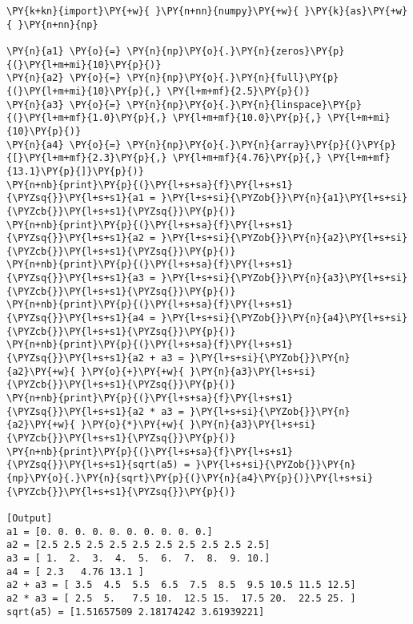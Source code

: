 \begin{Verbatim}[label=\makebox{\href{https://github.com/unipi-physics-labs/lab1-notes/tree/main/snippy/numpy_arrays.py}{https://github.com/.../numpy\_arrays.py}},commandchars=\\\{\}]
\PY{k+kn}{import}\PY{+w}{ }\PY{n+nn}{numpy}\PY{+w}{ }\PY{k}{as}\PY{+w}{ }\PY{n+nn}{np}

\PY{n}{a1} \PY{o}{=} \PY{n}{np}\PY{o}{.}\PY{n}{zeros}\PY{p}{(}\PY{l+m+mi}{10}\PY{p}{)}
\PY{n}{a2} \PY{o}{=} \PY{n}{np}\PY{o}{.}\PY{n}{full}\PY{p}{(}\PY{l+m+mi}{10}\PY{p}{,} \PY{l+m+mf}{2.5}\PY{p}{)}
\PY{n}{a3} \PY{o}{=} \PY{n}{np}\PY{o}{.}\PY{n}{linspace}\PY{p}{(}\PY{l+m+mf}{1.0}\PY{p}{,} \PY{l+m+mf}{10.0}\PY{p}{,} \PY{l+m+mi}{10}\PY{p}{)}
\PY{n}{a4} \PY{o}{=} \PY{n}{np}\PY{o}{.}\PY{n}{array}\PY{p}{(}\PY{p}{[}\PY{l+m+mf}{2.3}\PY{p}{,} \PY{l+m+mf}{4.76}\PY{p}{,} \PY{l+m+mf}{13.1}\PY{p}{]}\PY{p}{)}
\PY{n+nb}{print}\PY{p}{(}\PY{l+s+sa}{f}\PY{l+s+s1}{\PYZsq{}}\PY{l+s+s1}{a1 = }\PY{l+s+si}{\PYZob{}}\PY{n}{a1}\PY{l+s+si}{\PYZcb{}}\PY{l+s+s1}{\PYZsq{}}\PY{p}{)}
\PY{n+nb}{print}\PY{p}{(}\PY{l+s+sa}{f}\PY{l+s+s1}{\PYZsq{}}\PY{l+s+s1}{a2 = }\PY{l+s+si}{\PYZob{}}\PY{n}{a2}\PY{l+s+si}{\PYZcb{}}\PY{l+s+s1}{\PYZsq{}}\PY{p}{)}
\PY{n+nb}{print}\PY{p}{(}\PY{l+s+sa}{f}\PY{l+s+s1}{\PYZsq{}}\PY{l+s+s1}{a3 = }\PY{l+s+si}{\PYZob{}}\PY{n}{a3}\PY{l+s+si}{\PYZcb{}}\PY{l+s+s1}{\PYZsq{}}\PY{p}{)}
\PY{n+nb}{print}\PY{p}{(}\PY{l+s+sa}{f}\PY{l+s+s1}{\PYZsq{}}\PY{l+s+s1}{a4 = }\PY{l+s+si}{\PYZob{}}\PY{n}{a4}\PY{l+s+si}{\PYZcb{}}\PY{l+s+s1}{\PYZsq{}}\PY{p}{)}
\PY{n+nb}{print}\PY{p}{(}\PY{l+s+sa}{f}\PY{l+s+s1}{\PYZsq{}}\PY{l+s+s1}{a2 + a3 = }\PY{l+s+si}{\PYZob{}}\PY{n}{a2}\PY{+w}{ }\PY{o}{+}\PY{+w}{ }\PY{n}{a3}\PY{l+s+si}{\PYZcb{}}\PY{l+s+s1}{\PYZsq{}}\PY{p}{)}
\PY{n+nb}{print}\PY{p}{(}\PY{l+s+sa}{f}\PY{l+s+s1}{\PYZsq{}}\PY{l+s+s1}{a2 * a3 = }\PY{l+s+si}{\PYZob{}}\PY{n}{a2}\PY{+w}{ }\PY{o}{*}\PY{+w}{ }\PY{n}{a3}\PY{l+s+si}{\PYZcb{}}\PY{l+s+s1}{\PYZsq{}}\PY{p}{)}
\PY{n+nb}{print}\PY{p}{(}\PY{l+s+sa}{f}\PY{l+s+s1}{\PYZsq{}}\PY{l+s+s1}{sqrt(a5) = }\PY{l+s+si}{\PYZob{}}\PY{n}{np}\PY{o}{.}\PY{n}{sqrt}\PY{p}{(}\PY{n}{a4}\PY{p}{)}\PY{l+s+si}{\PYZcb{}}\PY{l+s+s1}{\PYZsq{}}\PY{p}{)}

[Output]
a1 = [0. 0. 0. 0. 0. 0. 0. 0. 0. 0.]
a2 = [2.5 2.5 2.5 2.5 2.5 2.5 2.5 2.5 2.5 2.5]
a3 = [ 1.  2.  3.  4.  5.  6.  7.  8.  9. 10.]
a4 = [ 2.3   4.76 13.1 ]
a2 + a3 = [ 3.5  4.5  5.5  6.5  7.5  8.5  9.5 10.5 11.5 12.5]
a2 * a3 = [ 2.5  5.   7.5 10.  12.5 15.  17.5 20.  22.5 25. ]
sqrt(a5) = [1.51657509 2.18174242 3.61939221]
\end{Verbatim}
